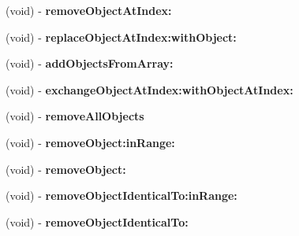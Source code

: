 \begin{DoxyCompactItemize}
\item 
\hypertarget{interfaceget_open_orders_by_g_l_n_response_a76e6f7224027d096f116d11bc288dae0}{}(void) -\/ {\bfseries remove\+Object\+At\+Index\+:}\label{interfaceget_open_orders_by_g_l_n_response_a76e6f7224027d096f116d11bc288dae0}

\item 
\hypertarget{interfaceget_open_orders_by_g_l_n_response_a61cb989fb4a27935d648514b2a0d8550}{}(void) -\/ {\bfseries replace\+Object\+At\+Index\+:with\+Object\+:}\label{interfaceget_open_orders_by_g_l_n_response_a61cb989fb4a27935d648514b2a0d8550}

\item 
\hypertarget{interfaceget_open_orders_by_g_l_n_response_a42696d5a339f9b8146d0a8404d178c20}{}(void) -\/ {\bfseries add\+Objects\+From\+Array\+:}\label{interfaceget_open_orders_by_g_l_n_response_a42696d5a339f9b8146d0a8404d178c20}

\item 
\hypertarget{interfaceget_open_orders_by_g_l_n_response_a3e7c3506c3fac1c4f4c38892fb951217}{}(void) -\/ {\bfseries exchange\+Object\+At\+Index\+:with\+Object\+At\+Index\+:}\label{interfaceget_open_orders_by_g_l_n_response_a3e7c3506c3fac1c4f4c38892fb951217}

\item 
\hypertarget{interfaceget_open_orders_by_g_l_n_response_ab442a62ed55254e44f8c9ec03f4c5e5d}{}(void) -\/ {\bfseries remove\+All\+Objects}\label{interfaceget_open_orders_by_g_l_n_response_ab442a62ed55254e44f8c9ec03f4c5e5d}

\item 
\hypertarget{interfaceget_open_orders_by_g_l_n_response_ac89ba6aadd760ca32ab8a6580e02b7aa}{}(void) -\/ {\bfseries remove\+Object\+:in\+Range\+:}\label{interfaceget_open_orders_by_g_l_n_response_ac89ba6aadd760ca32ab8a6580e02b7aa}

\item 
\hypertarget{interfaceget_open_orders_by_g_l_n_response_ac47c96d7baaab5dfec1428a0b28838f1}{}(void) -\/ {\bfseries remove\+Object\+:}\label{interfaceget_open_orders_by_g_l_n_response_ac47c96d7baaab5dfec1428a0b28838f1}

\item 
\hypertarget{interfaceget_open_orders_by_g_l_n_response_a4efbe0c1698ef3a409e9cd2d36d52091}{}(void) -\/ {\bfseries remove\+Object\+Identical\+To\+:in\+Range\+:}\label{interfaceget_open_orders_by_g_l_n_response_a4efbe0c1698ef3a409e9cd2d36d52091}

\item 
\hypertarget{interfaceget_open_orders_by_g_l_n_response_ae4fc21d9b8622df797e63b7584f3f76b}{}(void) -\/ {\bfseries remove\+Object\+Identical\+To\+:}\label{interfaceget_open_orders_by_g_l_n_response_ae4fc21d9b8622df797e63b7584f3f76b}


\end{DoxyCompactItemize}
